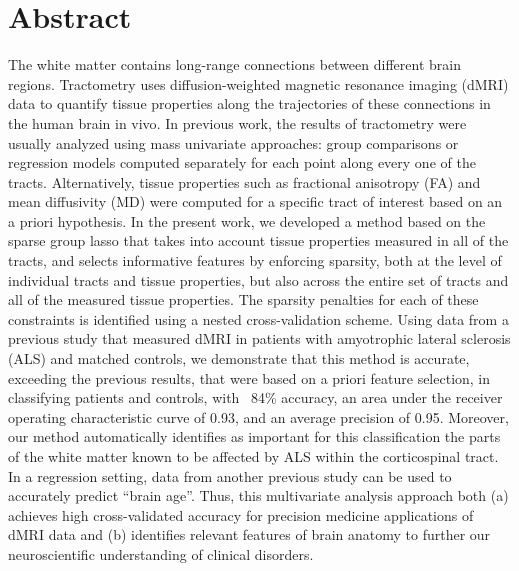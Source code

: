 \section*{Abstract}

The white matter contains long-range connections between different brain
regions. Tractometry uses diffusion-weighted magnetic resonance imaging (dMRI)
data to quantify tissue properties along the trajectories of these connections
in the human brain in vivo\cite{yeatman2012tract}. In previous work, the results
of tractometry were usually analyzed using mass univariate approaches: group
comparisons or regression models computed separately for each point along every
one of the tracts.  Alternatively, tissue properties such as fractional
anisotropy (FA) and mean diffusivity (MD) were computed for a specific tract of
interest based on an a priori hypothesis. In the present work, we developed a
method based on the sparse group lasso\cite{simon2013sparse} that takes into
account tissue properties measured in all of the tracts, and selects informative
features by enforcing sparsity, both at the level of individual tracts and
tissue properties, but also across the entire set of tracts and all of the
measured tissue properties. The sparsity penalties for each of these constraints
is identified using a nested cross-validation scheme. Using data from a previous
study that measured dMRI in patients with amyotrophic lateral sclerosis (ALS)
and matched controls\cite{sarica2017corticospinal}, we demonstrate that this
method is accurate, exceeding the previous results, that were based on a priori
feature selection, in classifying patients and controls, with ~84\% accuracy, an
area under the receiver operating characteristic curve of 0.93, and an average
precision of 0.95. Moreover, our method automatically identifies as important
for this classification the parts of the white matter known to be affected by
ALS within the corticospinal tract. In a regression setting, data from another
previous study\cite{yeatman2014lifespan} can be used to accurately predict
``brain age''. Thus, this multivariate analysis approach both (a) achieves high
cross-validated accuracy for precision medicine applications of dMRI data and
(b) identifies relevant features of brain anatomy to further our neuroscientific
understanding of clinical disorders.
